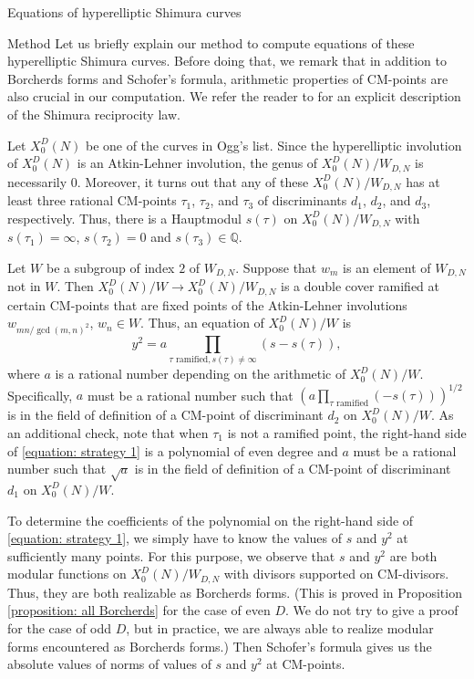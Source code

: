 \documentclass{amsart}
\theoremstyle{definition}
\def\Q{\mathbb Q}
\begin{document}
\begin{section}{Equations of hyperelliptic Shimura curves}
\begin{subsection}{Method}
Let us briefly explain our method to compute equations of these hyperelliptic
Shimura curves. Before doing that, we remark that in addition to
Borcherds forms and Schofer's formula, arithmetic properties of
CM-points are also crucial in our computation. We refer the reader to
\cite[Section 5]{Victor-genus-one} for an explicit description of the
Shimura reciprocity law.

Let $X_0^D(N)$ be one of the curves in Ogg's list. Since the
hyperelliptic involution of $X_0^D(N)$ is an Atkin-Lehner involution,
the genus of $X_0^D(N)/W_{D,N}$ is necessarily $0$. Moreover, it turns
out that any of these $X_0^D(N)/W_{D,N}$ has at least three rational
CM-points $\tau_1$, $\tau_2$, and $\tau_3$ of discriminants $d_1$,
$d_2$, and $d_3$, respectively. Thus, there is a Hauptmodul $s(\tau)$
on $X_0^D(N)/W_{D,N}$ with $s(\tau_1)=\infty$, $s(\tau_2)=0$ and
$s(\tau_3)\in\Q$.

Let $W$ be a subgroup of index $2$ of $W_{D,N}$. Suppose that $w_m$ is
an element of $W_{D,N}$ not in $W$. Then $X_0^D(N)/W\to
X_0^D(N)/W_{D,N}$ is a double cover ramified at certain CM-points that
are fixed points of the Atkin-Lehner involutions $w_{mn/\gcd(m,n)^2}$,
$w_n\in W$. Thus, an equation of $X_0^D(N)/W$ is
\begin{equation} \label{equation: strategy 1}
  y^2=a\prod_{\tau\text{ ramified},s(\tau)\neq\infty}(s-s(\tau)),
\end{equation}
where $a$ is a rational number depending on the arithmetic of
$X_0^D(N)/W$. Specifically, $a$ must be a rational number such that
$(a\prod_{\tau\text{ ramified}}(-s(\tau)))^{1/2}$ is in the field of
definition of a CM-point of discriminant $d_2$ on $X_0^D(N)/W$. As an
additional check, note that when $\tau_1$ is not a ramified point, the
right-hand side of \eqref{equation: strategy 1} is a polynomial of even
degree and $a$ must be a rational number such that $\sqrt a$
is in the field of definition of a CM-point of discriminant $d_1$ on
$X_0^D(N)/W$.

To determine the coefficients of the polynomial on the right-hand side
of \eqref{equation: strategy 1}, we simply have to know the values of
$s$ and $y^2$ at sufficiently many points. For this purpose, we
observe that $s$ and $y^2$ are both modular functions on
$X_0^D(N)/W_{D,N}$ with divisors supported on CM-divisors. Thus, they
are both realizable as Borcherds forms. (This is proved in Proposition
\ref{proposition: all Borcherds} for the case of even $D$. We do not
try to give a proof for the case of odd $D$, but in practice, we are
always able to realize modular forms encountered as Borcherds forms.)
Then Schofer's formula gives us the absolute values of norms of values
of $s$ and $y^2$ at CM-points.


\end{subsection}
\end{section}
\end{document}
